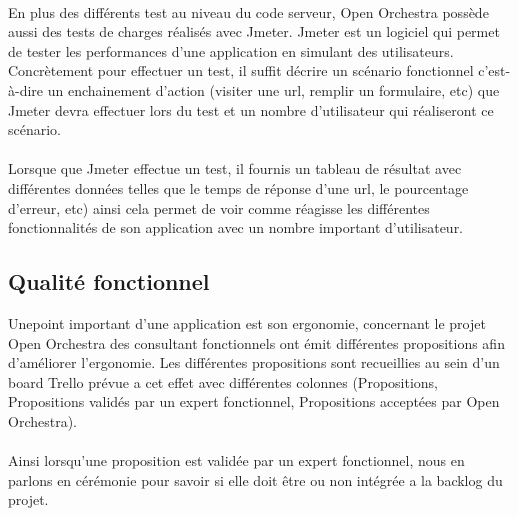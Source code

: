   \paragraph{}
  En plus des différents test au niveau du code serveur, Open Orchestra possède aussi des tests de charges réalisés avec Jmeter. Jmeter est un logiciel qui permet de tester les performances d'une application en simulant des utilisateurs. Concrètement pour effectuer un test, il suffit décrire un scénario fonctionnel c'est-à-dire un enchainement d'action (visiter une url, remplir un formulaire, etc) que Jmeter devra effectuer lors du test et un nombre d'utilisateur qui réaliseront ce scénario.
  
  \paragraph{}
  Lorsque que Jmeter effectue un test, il fournis un tableau de résultat avec différentes données telles que le temps de réponse d'une url, le pourcentage d'erreur, etc) ainsi cela permet de voir comme réagisse les différentes fonctionnalités de son application avec un nombre important d'utilisateur.
\subsection{Qualité fonctionnel}
Unepoint important d'une application est son ergonomie, concernant le projet Open Orchestra des consultant fonctionnels ont émit différentes propositions afin d'améliorer l'ergonomie.  Les différentes propositions sont recueillies au sein d'un board Trello prévue a cet effet avec différentes colonnes (Propositions, Propositions validés par un expert fonctionnel, Propositions acceptées par Open Orchestra). 
  \paragraph{}
  Ainsi lorsqu'une proposition est validée par un expert fonctionnel, nous en parlons en cérémonie pour savoir si elle doit être ou non intégrée a la backlog du projet. 